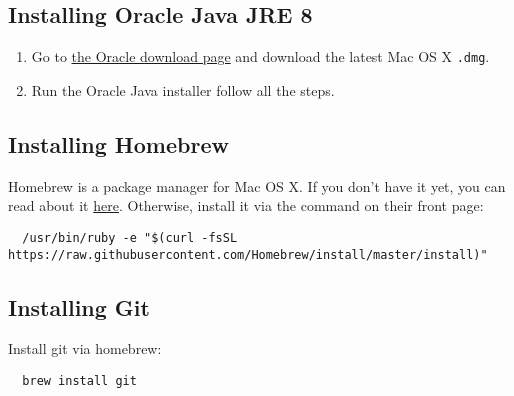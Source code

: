 \documentclass[../setup.tex]{subfiles}
\begin{document}
\subsection{Installing Oracle Java JRE 8}
\begin{enumerate}
  \item
    Go to
    \href{http://www.oracle.com/technetwork/java/javase/downloads/jre8-downloads-2133155.html} {the
    Oracle download page} and download the latest Mac OS X \lstinline{.dmg}.
  \item
    Run the Oracle Java installer follow all the steps.
\end{enumerate}

\subsection{Installing Homebrew}
Homebrew is a package manager for Mac OS X. If you don't have it yet, you can read about it
\href{https://brew.sh/} {here}. Otherwise, install it via the command on their front page:
\begin{lstlisting}
  /usr/bin/ruby -e "$(curl -fsSL https://raw.githubusercontent.com/Homebrew/install/master/install)"
\end{lstlisting}

\subsection{Installing Git}
Install git via homebrew:
\begin{lstlisting}
  brew install git
\end{lstlisting}
\end{document}
